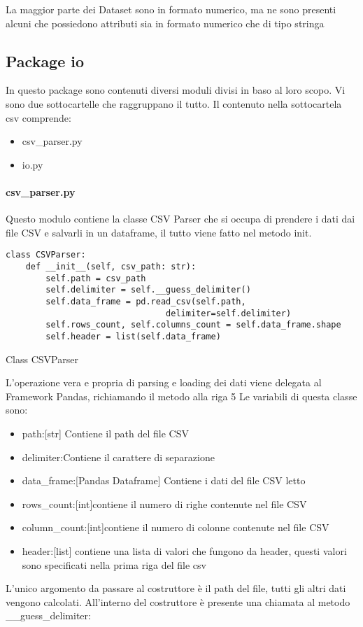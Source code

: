 La maggior parte dei Dataset sono in formato numerico, ma ne sono presenti alcuni che possiedono attributi sia in formato numerico che di tipo stringa

\subsection{Package io}
In questo package sono contenuti diversi moduli divisi in baso al loro scopo. Vi sono due sottocartelle che raggruppano il tutto.
Il contenuto nella sottocartela csv comprende:
\begin{itemize}[noitemsep]
\let\labelitemi\labelitemii
    \item csv{\_}parser.py
    \item io.py
\end{itemize}

\paragraph{csv{\_}parser.py}
Questo modulo contiene la classe CSV Parser che si occupa di prendere i dati dai file CSV e salvarli in un dataframe, il tutto viene fatto nel metodo init.
\begin{listing}[H]
\begin{verbatim}
class CSVParser:
    def __init__(self, csv_path: str):
        self.path = csv_path
        self.delimiter = self.__guess_delimiter()
        self.data_frame = pd.read_csv(self.path, 
                                delimiter=self.delimiter)
        self.rows_count, self.columns_count = self.data_frame.shape
        self.header = list(self.data_frame)
\end{verbatim}
\caption{Class CSVParser}
\label{Code:1}
\end{listing}
L'operazione vera e propria di parsing e loading dei dati viene delegata al Framework Pandas, richiamando il metodo alla riga 5
Le variabili di questa classe sono:
\begin{itemize}[noitemsep]
    \item path:[str] Contiene il path del file CSV
    \item delimiter:Contiene il carattere di separazione
    \item data{\_}frame:[Pandas Dataframe] Contiene i dati del file CSV letto
    \item rows{\_}count:[int]contiene il numero di righe contenute nel file CSV
    \item column{\_}count:[int]contiene il numero di colonne contenute nel file CSV
    \item header:[list] contiene una lista di valori che fungono da header, questi valori sono specificati nella prima riga del file csv
\end{itemize}
L'unico argomento da passare al costruttore è il path del file, tutti gli altri dati vengono calcolati. 
All'interno del costruttore è presente una chiamata al metodo {\_\_}guess{\_}delimiter:

